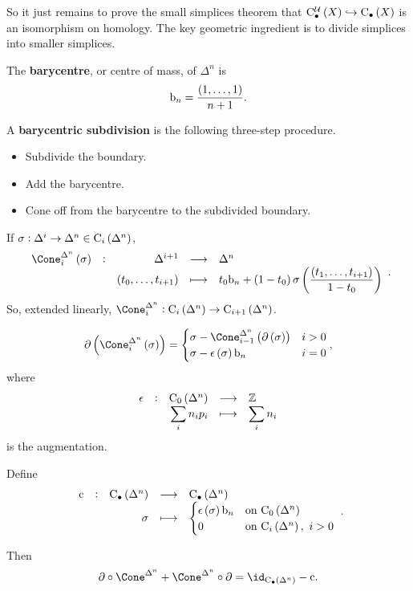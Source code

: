 So it just remains to prove the small simplices theorem that $ \C_\bullet^\UUU\br{X} \hookrightarrow \C_\bullet\br{X} $ is an isomorphism on homology. The key geometric ingredient is to divide simplices into smaller simplices.

\begin{definition*}
The \textbf{barycentre}, or centre of mass, of $ \Delta^n $ is
$$ \b_n = \dfrac{\br{1, \dots, 1}}{n + 1}. $$
\end{definition*}

A \textbf{barycentric subdivision} is the following three-step procedure.
\begin{itemize}
\item Subdivide the boundary.
\item Add the barycentre.
\item Cone off from the barycentre to the subdivided boundary.
\end{itemize}

\begin{definition*}
If $ \sigma : \Delta^i \to \Delta^n \in \C_i\br{\Delta^n} $,
$$ \function[\Cone_i^{\Delta^n}\br{\sigma}]{\Delta^{i + 1}}{\Delta^n}{\br{t_0, \dots, t_{i + 1}}}{t_0\b_n + \br{1 - t_0}\sigma\br{\dfrac{\br{t_1, \dots, t_{i + 1}}}{1 - t_0}}}. $$
So, extended linearly, $ \Cone_i^{\Delta^n} : \C_i\br{\Delta^n} \to \C_{i + 1}\br{\Delta^n} $.
\end{definition*}

\begin{exercise*}
$$ \da\br{\Cone_i^{\Delta^n}\br{\sigma}} =
\begin{cases}
\sigma - \Cone_{i - 1}^{\Delta^n}\br{\da\br{\sigma}} & i > 0 \\
\sigma - \epsilon\br{\sigma}\b_n & i = 0
\end{cases},
$$
where
$$ \function[\epsilon]{\C_0\br{\Delta^n}}{\ZZ}{\displaystyle\sum_i n_ip_i}{\displaystyle\sum_i n_i} $$
is the augmentation.
\end{exercise*}

\begin{definition*}
Define
$$ \function[\c]{\C_\bullet\br{\Delta^n}}{\C_\bullet\br{\Delta^n}}{\sigma}{
\begin{cases}
\epsilon\br{\sigma}\b_n & \text{on} \ \C_0\br{\Delta^n} \\
0 & \text{on} \ \C_i\br{\Delta^n}, \ i > 0
\end{cases}
}. $$
\end{definition*}

Then
$$ \da \circ \Cone^{\Delta^n} + \Cone^{\Delta^n} \circ \da = \id_{\C_\bullet\br{\Delta^n}} - \c. $$


